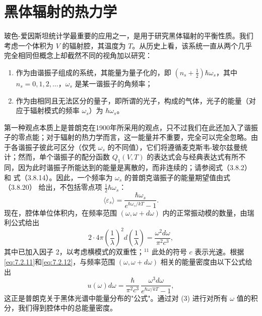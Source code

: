 \section{黑体辐射的热力学}\label{sec:7_3_blackbody}
玻色-爱因斯坦统计学最重要的应用之一，是用于研究黑体辐射的平衡性质。我们考虑一个体积为 \(V\) 的辐射腔，其温度为 \(T\)。从历史上看，该系统一直从两个几乎完全相同但概念上却截然不同的视角加以研究：
\begin{enumerate}
\item 作为由谐振子组成的系统，其能量为量子化的，即 \((n_s+\frac{1}{2})\hbar\omega_s\)，其中 \(n_s=0,1,2,\ldots\)，\(\omega_s\) 是某一谐振子的角频率；
\item 作为由相同且无法区分的量子，即所谓的光子，构成的气体，光子的能量（对应于辐射模式的频率 \(\omega_s\)）为 \(\hbar\omega_s\)。
\end{enumerate}
第一种观点本质上是普朗克在1900年所采用的观点，只不过我们在此还加入了谐振子的零点能；对于辐射的热力学而言，这一能量并不重要，完全可以完全忽略。由于各谐振子彼此可区分（仅凭 \(\omega_{s}\) 的不同值），它们将遵循麦克斯韦-玻尔兹曼统计；然而，单个谐振子的配分函数 \(Q_{1}(V,T)\) 的表达式会与经典表达式有所不同，因为此时谐振子所能达到的能量是离散的，而非连续的；请参阅式（3.8.2） 和 式（3.8.14）。因此，一个频率为 \(\omega_{s}\) 的普朗克谐振子的能量期望值由式（3.8.20） 给出，不包括零点项 \(\frac{1}{2}\hbar\omega_{s}\)：
\begin{equation}\tag{7.2.11}\label{eq:7.2.11}
\langle \varepsilon _ { s } \rangle = \frac { \hbar \omega _ { s } } { e ^{\hbar \omega _ { s} / k T } - 1 } .
\end{equation}
现在，腔体单位体积内，在频率范围 \((\omega, \omega + d\omega)\) 内的正常振动模的数量，由瑞利公式给出
\begin{equation}\tag{7.2.12}\label{eq:7.2.12}
2 \cdot 4 \pi \left( \frac { 1 } { \lambda } \right) ^{2} d \left( \frac { 1 } { \lambda } \right) = \frac { \omega ^{2} d \omega } { \pi ^{2} c ^{3} } ,
\end{equation}
其中已加入因子 2，以考虑横模式的双重性；\(^{11}\) 此处的符号 \(c\) 表示光速。根据\autoref{eq:7.2.11}和\autoref{eq:7.2.12}，与频率范围 \((\omega, \omega + d\omega)\) 相关的能量密度由以下公式给出
\begin{equation}\tag{7.2.13}\label{eq:7.2.13}
u ( \omega ) d \omega = \frac { \hbar } { \pi ^{2} c ^{3} } \, \frac { \omega ^{3} d \omega } { e ^{\hbar \omega / k T} - 1 } ,
\end{equation}
这正是普朗克关于黑体光谱中能量分布的"公式"。通过对 (3) 进行对所有 \(\omega\) 值的积分，我们得到腔体中的总能量密度。
